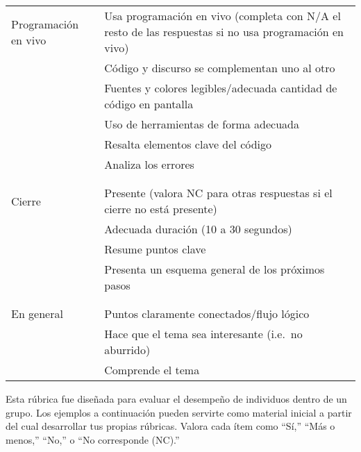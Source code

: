\begin{longtable}{p{}p{}}
  Programación en vivo
  & Usa programación en vivo (completa con N/A el resto de las respuestas si no usa programación en vivo) \\
  & Código y discurso se complementan uno al otro\\
  & Fuentes y colores legibles/adecuada cantidad de código en pantalla \\
  & Uso de herramientas de forma adecuada \\
  & Resalta elementos clave del código \\
  & Analiza los errores \\
  \\ [-1.5ex] \hline \\ [-1.5ex]

  Cierre
  & Presente (valora NC para otras respuestas si el cierre no está presente) \\
  & Adecuada duración (10 a 30 segundos) \\
  & Resume puntos clave \\
  & Presenta un esquema general de los próximos pasos \\
  \\ [-1.5ex] \hline \\ [-1.5ex]

  En general
  & Puntos claramente conectados/flujo lógico \\
  & Hace que el tema sea interesante (i.e.\ no aburrido) \\
  & Comprende el tema \\

\end{longtable}


Esta rúbrica fue diseñada para evaluar el desempeño de individuos dentro de un grupo. 
Los ejemplos a continuación pueden servirte como material inicial a partir del cual desarrollar tus propias rúbricas. 
Valora cada ítem como ``Sí,'' ``Más o menos,'' ``No,'' o ``No corresponde (NC).''

